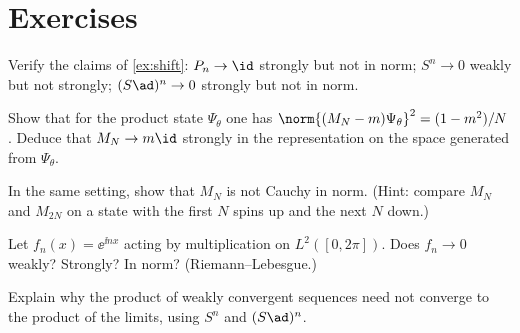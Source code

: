\section*{Exercises}
\begin{exercise}
Verify the claims of \cref{ex:shift}: $P_n\to\id$ strongly but not in norm; $S^n\to0$ weakly but not strongly; $(S\ad)^n\to0$ strongly but not in norm.
\end{exercise}
\begin{exercise}
Show that for the product state $\Psi_\theta$ one has $\norm{(M_N-m)\Psi_\theta}^2=(1-m^2)/N$. Deduce that $M_N\to m\id$ strongly in the representation on the space generated from $\Psi_\theta$.
\end{exercise}
\begin{exercise}
In the same setting, show that $M_N$ is not Cauchy in norm. (Hint: compare $M_N$ and $M_{2N}$ on a state with the first $N$ spins up and the next $N$ down.)
\end{exercise}
\begin{exercise}
Let $f_n(x)=\ee^{\ii nx}$ acting by multiplication on $L^2([0,2\pi])$. Does $f_n\to0$ weakly? Strongly? In norm? (Riemann--Lebesgue.)
\end{exercise}
\begin{exercise}
Explain why the product of weakly convergent sequences need not converge to the product of the limits, using $S^n$ and $(S\ad)^n$.
\end{exercise}
